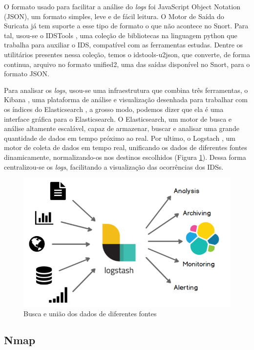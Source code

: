 \documentclass[
	12pt,				
	openright,		
	twoside,	
	a4paper,
	english,	
	brazil	
	]{abntex2}
\begin{document}
O formato usado para facilitar a análise do \textit{logs} foi JavaScript Object Notation (JSON), um formato simples, leve e de fácil leitura. O Motor de Saída do Suricata já tem suporte a esse tipo de formato o que não acontece no Snort. Para tal, usou-se o IDSTools \cite{py-idstools}, uma coleção de bibliotecas na linguagem python que trabalha para auxiliar o IDS, compatível com as ferramentas estudas. Dentre os utilitários presentes nessa coleção, temos o idstools-u2json, que converte, de forma continua, arquivo no formato unified2, uma das saídas disponível no Snort, para o formato JSON.

Para analisar os \textit{logs}, usou-se uma infraestrutura que combina três ferramentas, o Kibana \cite{kibana}, uma plataforma de análise e visualização desenhada para trabalhar com os índices do Elasticsearch \cite{elasticsearch}, a grosso modo, podemos dizer que ela é uma interface gráfica para o Elasticsearch. O Elasticsearch, um motor de busca e análise altamente escalável, capaz de armazenar, buscar e analisar uma grande quantidade de dados em tempo próximo ao real. Por ultimo, o Logstach \cite{logstach}, um motor de coleta de dados em tempo real, unificando os dados de diferentes fontes dinamicamente, normalizando-os nos destinos escolhidos (Figura \ref{fig:logstach}). Dessa forma centralizou-se os \textit{logs}, facilitando a visualização das ocorrências dos IDSs. 

\begin{figure}[!htp]
 \centering
 \includegraphics[scale=.4]{logstach.png}
 \caption{Busca e união dos dados de diferentes fontes}
 \label{fig:logstach}
\end{figure}

\subsection{Nmap} \label{sec:nmap}
\end{document}
